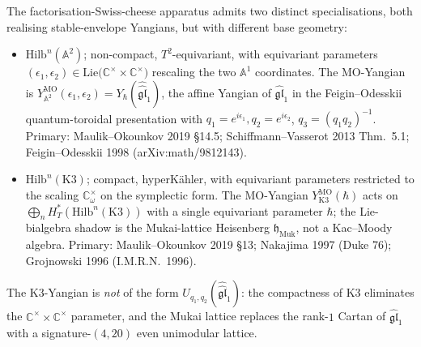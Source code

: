 \begin{remark}
\label{rem:fsc-K3-vs-A2-compactness}
The factorisation-Swiss-cheese apparatus admits two distinct
specialisations, both realising stable-envelope Yangians, but with
different base geometry:
\begin{itemize}
\item $\mathrm{Hilb}^n(\mathbb{A}^2)$; non-compact, $T^2$-equivariant,
 with equivariant parameters $(\epsilon_1, \epsilon_2) \in
 \mathrm{Lie}\bigl(\mathbb{C}^\times \times
 \mathbb{C}^\times\bigr)$ rescaling the two $\mathbb{A}^1$
 coordinates. The MO-Yangian is
 $Y^{\mathrm{MO}}_{\mathbb{A}^2}(\epsilon_1, \epsilon_2) =
 Y_\hbar(\widehat{\widehat{\mathfrak{gl}}}_1)$, the affine Yangian
 of $\widehat{\mathfrak{gl}}_1$ in the Feigin--Odesskii
 quantum-toroidal presentation with
 $q_1 = e^{i\epsilon_1}, q_2 = e^{i\epsilon_2}$,
 $q_3 = (q_1 q_2)^{-1}$. Primary: Maulik--Okounkov 2019 \S 14.5;
 Schiffmann--Vasserot 2013 Thm.~5.1; Feigin--Odesskii 1998
 (arXiv:math/9812143).
\item $\mathrm{Hilb}^n(\mathrm{K3})$; compact, hyperK\"ahler, with
 equivariant parameters restricted to the scaling
 $\mathbb{C}^\times_\omega$ on the symplectic form. The MO-Yangian
 $Y^{\mathrm{MO}}_{\mathrm K3}(\hbar)$ acts on
 $\bigoplus_n H^*_T(\mathrm{Hilb}^n(\mathrm{K3}))$ with a single
 equivariant parameter $\hbar$; the Lie-bialgebra shadow is the
 Mukai-lattice Heisenberg $\mathfrak{h}_{\mathrm{Muk}}$, not a
 Kac--Moody algebra. Primary: Maulik--Okounkov 2019 \S 13;
 Nakajima 1997 (Duke 76); Grojnowski 1996 (I.M.R.N.~1996).
\end{itemize}
The K3-Yangian is \emph{not} of the form
$U_{q_1, q_2}(\widehat{\widehat{\mathfrak{gl}}}_1)$: the compactness
of $\mathrm{K3}$ eliminates the $\mathbb{C}^\times \times
\mathbb{C}^\times$ parameter, and the Mukai lattice replaces the
rank-$1$ Cartan of $\widehat{\mathfrak{gl}}_1$ with a signature-$(4,20)$
even unimodular lattice.
\end{remark}


